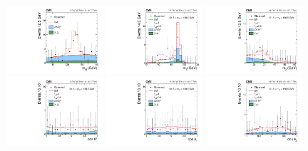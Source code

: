 \begin{figure}
\centering
\includegraphics[width=0.32\textwidth]{Spin_Parity/cCompare_DataMC_AllTeV_ZZMass.pdf}
\includegraphics[width=0.32\textwidth]{Spin_Parity/cCompare_DataMC_AllTeV_Z1Mass_SignalEnriched.pdf}
\includegraphics[width=0.32\textwidth]{Spin_Parity/cCompare_DataMC_AllTeV_Z2Mass_SignalEnriched.pdf} \\
\includegraphics[width=0.32\textwidth]{Spin_Parity/cCompare_DataMC_AllTeV_costhetastar_SignalEnriched.pdf}
\includegraphics[width=0.32\textwidth]{Spin_Parity/cCompare_DataMC_AllTeV_helcosthetaZ1_SignalEnriched.pdf}
\includegraphics[width=0.32\textwidth]{Spin_Parity/cCompare_DataMC_AllTeV_helcosthetaZ2_SignalEnriched.pdf} \\

\end{figure}
